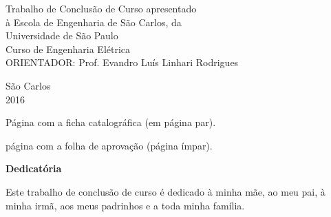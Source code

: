 		\large
		{
			\begin{flushright}
			\Large{Trabalho de Conclusão de Curso apresentado} \hspace{1cm}\\
			\Large{à Escola de Engenharia de São Carlos, da}\\
			\Large{Universidade de São Paulo}\\
			\vspace{0.05\textheight}
			\Large{Curso de Engenharia Elétrica}\\
			\vspace{0.05\textheight}
			\Large{ORIENTADOR: Prof. Evandro Luís Linhari Rodrigues}\\
			\end{flushright}
	
			\begin{center}
				\vspace{0.15\textheight}
				\Large{São Carlos}\\
				\Large{2016}
			\end{center}
		}



\newpage

Página com a ficha catalográfica (em página par).

%

\newpage

página com a folha de aprovação (página ímpar). \cleardoublepage

\begin{comment}
\begin{figure}[H]
	\centering
	\texttt{[image: ./Resources/aprovacao.jpg]}
	\caption{Fluxo de comunicação entre os principais componentes.}
	\label{Aprovacao}
\end{figure}
\cleardoublepage
\end{comment}
\vspace{0.11\textheight} 
\begin{center}
\textbf{\Huge{Dedicatória}}
\end{center}
\vspace{0.05\textheight}

Este trabalho de conclusão de curso é dedicado à minha mãe, ao meu pai, à minha irmã, aos meus padrinhos e a toda minha família.

